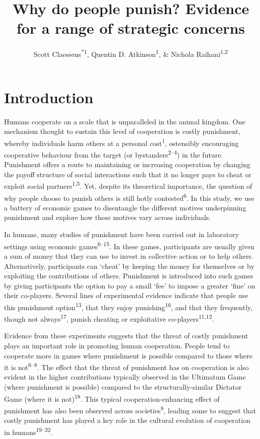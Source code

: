 \documentclass[
  man,floatsintext]{apa6}
\title{Why do people punish? Evidence for a range of strategic concerns}
\author{Scott Claessens\textsuperscript{*1}, Quentin D. Atkinson\textsuperscript{1}, \& Nichola Raihani\textsuperscript{1,2}}
\date{}
\affiliation{\vspace{0.5cm}\textsuperscript{1} \footnotesize School of Psychology, University of Auckland, Auckland, New Zealand\\\textsuperscript{2} \footnotesize Department of Experimental Psychology, University College London, London, United Kingdom}
\begin{document}
\maketitle

\linenumbers

\hypertarget{introduction}{%
\section{Introduction}\label{introduction}}

Humans cooperate on a scale that is unparalleled in the animal kingdom. One
mechanism thought to sustain this level of cooperation is costly punishment,
whereby individuals harm others at a personal cost\textsuperscript{1},
ostensibly encouraging cooperative behaviour from the target (or bystanders\textsuperscript{2--4}) in the future. Punishment offers a
route to maintaining or increasing cooperation by changing the payoff structure
of social interactions such that it no longer pays to cheat or exploit social
partners\textsuperscript{1,5}. Yet, despite its theoretical
importance, the question of why people choose to punish others is still hotly
contested\textsuperscript{6}. In this study, we use a battery of economic games to
disentangle the different motives underpinning punishment and explore how these
motives vary across individuals.

In humans, many studies of punishment have been carried out in laboratory
settings using economic games\textsuperscript{6--15}. In these games, participants are usually given a sum of money
that they can use to invest in collective action or to help others.
Alternatively, participants can `cheat' by keeping the money for themselves or
by exploiting the contributions of others. Punishment is introduced into such
games by giving participants the option to pay a small `fee' to impose a greater
`fine' on their co-players. Several lines of experimental evidence indicate that
people use this punishment option\textsuperscript{13}, that they enjoy
punishing\textsuperscript{16}, and that they frequently, though not
always\textsuperscript{17}, punish cheating or exploitative
co-players\textsuperscript{11,12}.

Evidence from these experiments suggests that the threat of costly punishment
plays an important role in promoting human cooperation. People tend to cooperate
more in games where punishment is possible compared to those where it is not\textsuperscript{6--8}. The effect that the threat of
punishment has on cooperation is also evident in the higher contributions
typically observed in the Ultimatum Game (where punishment is possible) compared
to the structurally-similar Dictator Game (where it is not)\textsuperscript{18}. This
typical cooperation-enhancing effect of punishment has also been observed across
societies\textsuperscript{8}, leading some to suggest that costly punishment has
played a key role in the cultural evolution of cooperation in humans\textsuperscript{19--22}.
\end{document}

